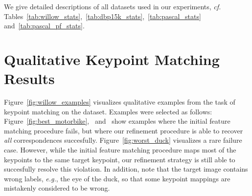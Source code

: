 \documentclass{article}
\def\eg{\emph{e.g.}} \def\Eg{\emph{E.g.}}  \def\ie{\emph{i.e.}} \def\Ie{\emph{I.e.}}  \def\cf{\emph{cf.}}  \def\Cf{\emph{Cf.}}
\begin{document}
\begin{table}[t]
  \centering
  \caption{Statistics of the \textsc{PascalPF} dataset.}\label{tab:pascal_pf_stats}
  \renewcommand{\arraystretch}{1.1}
\end{table}

We give detailed descriptions of all datasets used in our experiments, \cf{} Tables~\ref{tab:willow_stats},~\ref{tab:dbp15k_stats},~\ref{tab:pascal_stats} and~\ref{tab:pascal_pf_stats}.

\section{Qualitative Keypoint Matching Results}\label{sec:qualitative_keypoint_matching_results}

Figure~\ref{fig:willow_examples} visualizes qualitative examples from the task of keypoint matching on the  dataset.
Examples were selected as follows:
Figure~\ref{fig:best_motorbike},~ and~ show examples where the initial feature matching procedure fails, but where our refinement procedure is able to recover \emph{all} correspondences succesfully.
Figure~\ref{fig:worst_duck} visualizes a rare failure case.
However, while the initial feature matching procedure maps most of the keypoints to the same target keypoint, our refinement strategy is still able to succesfully resolve this violation.
In addition, note that the target image contains wrong labels, \eg{}, the eye of the duck, so that some keypoint mappings are mistakenly considered to be wrong.
\end{document}
